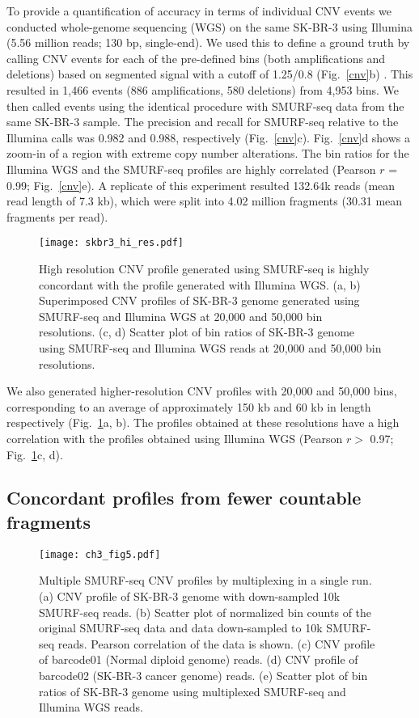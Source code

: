 To provide a quantification of accuracy in terms of individual CNV
events we conducted whole-genome sequencing (WGS) on the same SK-BR-3
using Illumina (5.56 million reads; 130 bp, single-end).  We used this
to define a ground truth by calling CNV events for each of the
pre-defined bins (both amplifications and deletions) based on segmented
signal with a cutoff of 1.25/0.8 (Fig.~\ref{cnv}b)
\citep{dago2014rapid,berry2017potential}. This resulted in 1,466 events
(886 amplifications, 580 deletions) from 4,953 bins. We then called
events using the identical procedure with SMURF-seq data from the same
SK-BR-3 sample. The precision and recall for SMURF-seq relative to the
Illumina calls was 0.982 and 0.988, respectively (Fig.~\ref{cnv}c).
Fig.~\ref{cnv}d shows a zoom-in of a region with extreme copy number
alterations. The bin ratios for the Illumina WGS and the SMURF-seq
profiles are highly correlated (Pearson $r$ = 0.99; Fig.~\ref{cnv}e).
A replicate of this experiment resulted 132.64k reads (mean read length
of 7.3 kb), which were split into 4.02 million fragments (30.31 mean
fragments per read).

\begin{figure}[t!]
\centering
\texttt{[image: skbr3\_hi\_res.pdf]}
\caption[High resolution CNV profile with SMURF-seq]{
  High resolution CNV profile generated using SMURF-seq is highly concordant
  with the profile generated with Illumina WGS.
  (a, b) Superimposed CNV profiles of SK-BR-3 genome generated using SMURF-seq
  and Illumina WGS at 20,000 and 50,000 bin resolutions.
  (c, d) Scatter plot of bin ratios of SK-BR-3 genome using
  SMURF-seq and Illumina WGS reads at 20,000 and 50,000 bin resolutions. }
  \label{skbr3_hi_res}
\end{figure}

We also generated higher-resolution CNV profiles with 20,000 and 50,000
bins, corresponding to an average of approximately 150 kb and 60 kb in
length respectively (Fig.~\ref{skbr3_hi_res}a, b). The profiles obtained
at these resolutions have a high correlation with the profiles obtained
using Illumina WGS (Pearson $r>$ 0.97; Fig.~\ref{skbr3_hi_res}c, d).



\subsection{Concordant profiles from fewer countable fragments}
\begin{figure}[t!]
\centering
\texttt{[image: ch3\_fig5.pdf]}
\caption[Multiple SMURF-seq CNV profiles by multiplexing in a single run]{
  Multiple SMURF-seq CNV profiles by multiplexing in a single run.
  (a) CNV profile of SK-BR-3 genome with down-sampled 10k SMURF-seq reads.
  (b) Scatter plot of normalized bin counts of the original SMURF-seq
  data and data down-sampled to 10k SMURF-seq reads. Pearson
  correlation of the data is shown.
  (c) CNV profile of barcode01 (Normal diploid genome) reads.
  (d) CNV profile of barcode02 (SK-BR-3 cancer genome) reads.
  (e) Scatter plot of bin ratios of SK-BR-3 genome using
  multiplexed SMURF-seq and Illumina WGS reads.}
\label{cnv_mux}
\end{figure}


